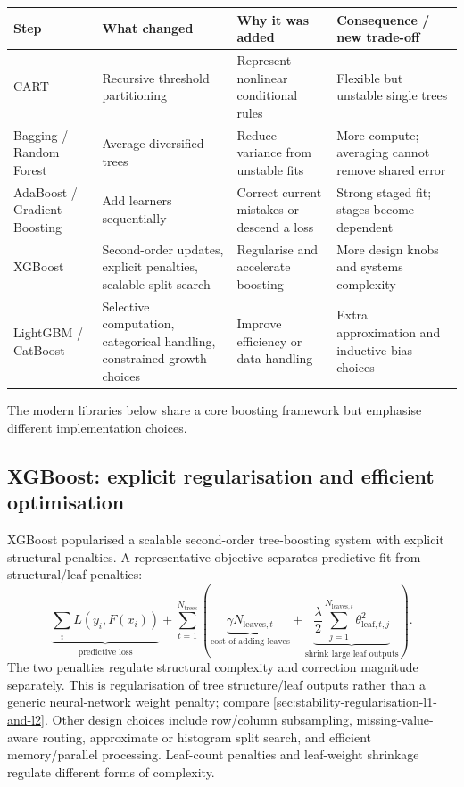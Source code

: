 \begin{center}
\small
\begin{tabularx}{\linewidth}{@{}L{.16\linewidth}L{.22\linewidth}YY@{}}
\toprule
\textbf{Step} & \textbf{What changed} & \textbf{Why it was added} & \textbf{Consequence / new trade-off} \\
\midrule
CART & Recursive threshold partitioning & Represent nonlinear conditional rules & Flexible but unstable single trees \\
Bagging / Random Forest & Average diversified trees & Reduce variance from unstable fits & More compute; averaging cannot remove shared error \\
AdaBoost / Gradient Boosting & Add learners sequentially & Correct current mistakes or descend a loss & Strong staged fit; stages become dependent \\
XGBoost & Second-order updates, explicit penalties, scalable split search & Regularise and accelerate boosting & More design knobs and systems complexity \\
LightGBM / CatBoost & Selective computation, categorical handling, constrained growth choices & Improve efficiency or data handling & Extra approximation and inductive-bias choices \\
\bottomrule
\end{tabularx}
\end{center}

The modern libraries below share a core boosting framework but emphasise different implementation choices.

\subsection{XGBoost: explicit regularisation and efficient optimisation}
\label{subsec:trees-xgboost-explicit-regularisation-and-efficient-optimisation}
XGBoost popularised a scalable second-order tree-boosting system with explicit structural penalties.
A representative objective separates predictive fit from structural/leaf penalties:
\begin{equation}
\underbrace{\sum_i L(y_i,F(x_i))}_{\text{predictive loss}}
+
\sum_{t=1}^{N_{\text{trees}}}
\left(
\underbrace{\gamma N_{\text{leaves},t}}_{\text{cost of adding leaves}}
+
\underbrace{
\frac{\lambda}{2}
\sum_{j=1}^{N_{\text{leaves},t}}\theta_{\text{leaf},t,j}^{2}
}_{\text{shrink large leaf outputs}}
\right).
\end{equation}
The two penalties regulate structural complexity and correction magnitude separately.
This is regularisation of tree structure/leaf outputs rather than a generic neural-network weight penalty; compare \cref{sec:stability-regularisation-l1-and-l2}.
Other design choices include row/column subsampling, missing-value-aware routing, approximate or histogram split search, and efficient memory/parallel processing.
Leaf-count penalties and leaf-weight shrinkage regulate different forms of complexity.

